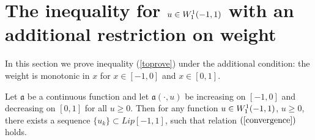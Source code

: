\section{The inequality for $u \in W_1^1(-1, 1)$ with an additional restriction on weight}
\label{ASC}

In this section we prove inequality (\ref{toprove}) under the additional condition:
the weight is monotonic in $x$ for $x \in [-1, 0]$ and $x \in [0, 1]$.

\begin{lm}
\label{Wapprox}
Let $\mathfrak a$ be a continuous function
and let $\mathfrak a(\cdot, u)$ be increasing on $[-1, 0]$ and decreasing on $[0, 1]$ for all $u \ge 0$.
Then for any function $u \in W_1^1(-1, 1)$, $u \ge 0$,
there exists a sequence $\{u_k\} \subset Lip[-1, 1]$, such that relation $(\ref{convergence})$ holds.
\end{lm}

